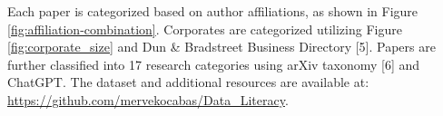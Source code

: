 \documentclass{article}
\begin{document}
Each paper is categorized based on author affiliations, as shown in Figure \ref{fig:affiliation-combination}. Corporates are categorized utilizing Figure \ref{fig:corporate_size} and Dun \& Bradstreet Business Directory [5]. Papers are further classified into 17 research categories using arXiv taxonomy [6] and ChatGPT. The dataset and additional resources are available at: \url{https://github.com/mervekocabas/Data_Literacy}.


\end{document}
